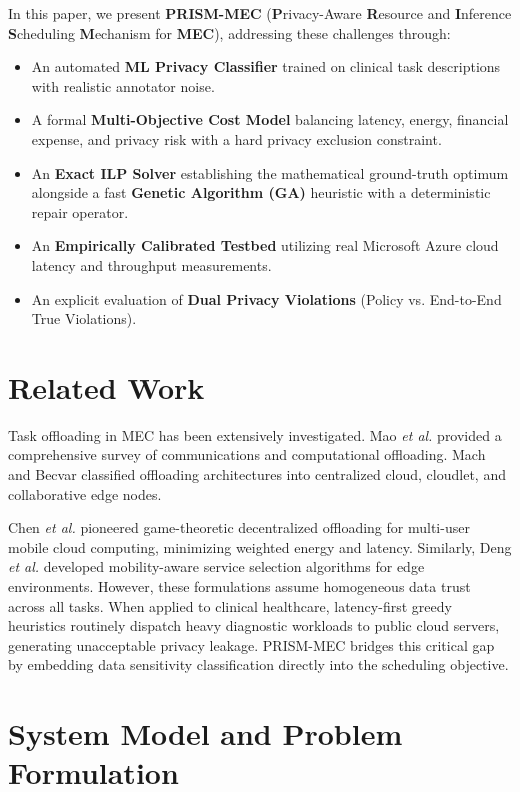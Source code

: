 \documentclass[conference]{IEEEtran}
\begin{document}
In this paper, we present \textbf{PRISM-MEC} (\textbf{P}rivacy-Aware \textbf{R}esource and \textbf{I}nference \textbf{S}cheduling \textbf{M}echanism for \textbf{MEC}), addressing these challenges through:
\begin{itemize}
    \item An automated \textbf{ML Privacy Classifier} trained on clinical task descriptions with realistic annotator noise.
    \item A formal \textbf{Multi-Objective Cost Model} balancing latency, energy, financial expense, and privacy risk with a hard privacy exclusion constraint.
    \item An \textbf{Exact ILP Solver} establishing the mathematical ground-truth optimum alongside a fast \textbf{Genetic Algorithm (GA)} heuristic with a deterministic repair operator.
    \item An \textbf{Empirically Calibrated Testbed} utilizing real Microsoft Azure cloud latency and throughput measurements.
    \item An explicit evaluation of \textbf{Dual Privacy Violations} (Policy vs. End-to-End True Violations).
\end{itemize}

\section{Related Work}
Task offloading in MEC has been extensively investigated. Mao \textit{et al.} \cite{mao2017survey} provided a comprehensive survey of communications and computational offloading. Mach and Becvar \cite{mach2017mobile} classified offloading architectures into centralized cloud, cloudlet, and collaborative edge nodes.

Chen \textit{et al.} \cite{chen2016efficient} pioneered game-theoretic decentralized offloading for multi-user mobile cloud computing, minimizing weighted energy and latency. Similarly, Deng \textit{et al.} \cite{deng2021mobile} developed mobility-aware service selection algorithms for edge environments. However, these formulations assume homogeneous data trust across all tasks. When applied to clinical healthcare, latency-first greedy heuristics routinely dispatch heavy diagnostic workloads to public cloud servers, generating unacceptable privacy leakage. PRISM-MEC bridges this critical gap by embedding data sensitivity classification directly into the scheduling objective.

\section{System Model and Problem Formulation}
\end{document}
